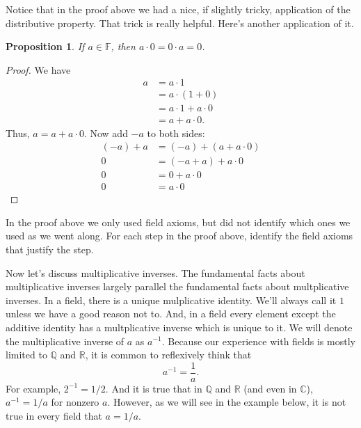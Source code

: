 \documentclass[11pt]{article}
\newenvironment{task}
	{\begin{mdframed}[linecolor=lightgray, linewidth=3pt]\raggedright}
	{\end{mdframed}}
\newtheorem{proposition}[theorem]{Proposition}
\theoremstyle{definition}
\begin{document}
Notice that in the proof above we had a nice, if slightly tricky, application of the distributive property. That trick is really helpful. Here's another 
application of it.

\begin{proposition}
  If $a\in\mathbb{F}$, then $a\cdot 0 = 0 \cdot a = 0$.
\end{proposition}
\begin{proof}
  We have 
  \begin{align*}
  a &= a\cdot 1\\
    &= a\cdot (1+0)\\
    &= a\cdot 1 + a\cdot 0\\
    &= a + a\cdot 0.
  \end{align*}
  Thus, $a = a + a \cdot 0$. Now add $-a$ to both sides:
  \begin{align*}
   (-a) + a &= (-a) + (a + a\cdot 0)\\
   0 &= (-a + a) + a\cdot 0\\
   0 &= 0 + a\cdot 0\\
   0 &= a\cdot 0
  \end{align*}
\end{proof}

\begin{task}
  In the proof above we only used field axioms, but did not identify which ones we used as we went along. For each step in the proof above, identify the
  field axioms that justify the step.
\end{task}

Now let's discuss multiplicative inverses. The fundamental facts about multiplicative inverses largely parallel the fundamental facts about multplicative inverses. In a field, there is a unique
mulplicative identity. We'll always call it $1$ unless we have a good reason not to. And, in a field every element except the additive identity has a multplicative inverse which is unique to it.
We will denote the multiplicative inverse of $a$ as $a^{-1}$. Because our experience with fields is mostly limited to $\mathbb{Q}$ and $\mathbb{R}$, it is common to reflexively think that 
\[ a^{-1} = \frac{1}{a}. \]
For example, $2^{-1} = 1/2$. And it is true that in $\mathbb{Q}$ and $\mathbb{R}$ (and even in $\mathbb{C}$), $a^{-1} = 1/a$ for nonzero $a$. However, as we will 
see in the example below, it is not true in every field that $a = 1/a$. 
\end{document}
